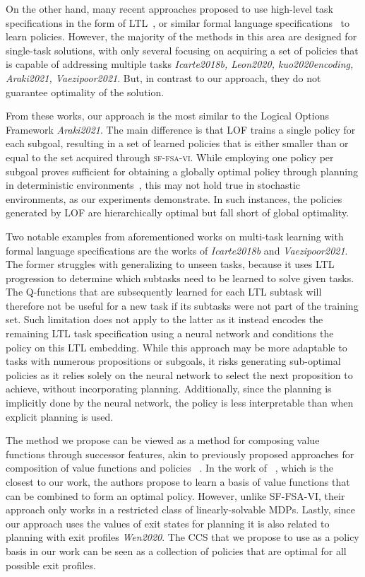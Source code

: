 On the other hand, many recent approaches proposed to use high-level task specifications in the form of LTL~\citep{Icarte2018b, Kuo2020, Vaezipoor2021, Jothimurugan2021}, or similar formal language specifications~\citep{ToroIcarte2019,Camacho2019, Araki2021, Icarte2022} to learn policies. However, the majority of the methods in this area are designed for single-task solutions, with only several focusing on acquiring a set of policies that is capable of addressing multiple tasks \textit{Icarte2018b, Leon2020, kuo2020encoding, Araki2021, Vaezipoor2021}. But, in contrast to our approach, they do not guarantee optimality of the solution.

From these works, our approach is the most similar to the Logical Options Framework \textit{Araki2021}. The main difference is that LOF trains a single policy for each subgoal, resulting in a set of learned policies that is either smaller than or equal to the set acquired through \textsc{sf-fsa-vi}. While employing one policy per subgoal proves sufficient for obtaining a globally optimal policy through planning in deterministic environments~\citep{Wen2020}, this may not hold true in stochastic environments, as our experiments demonstrate. In such instances, the policies generated by LOF are hierarchically optimal but fall short of global optimality.


Two notable examples from aforementioned works on multi-task learning with formal language specifications are the works of \textit{Icarte2018b} and \textit{Vaezipoor2021}. The former struggles with generalizing to unseen tasks, because it uses LTL progression to determine which subtasks need to be learned to solve given tasks. The Q-functions that are subsequently learned for each LTL subtask will therefore not be useful for a new task if its subtasks were not part of the training set. Such limitation does not apply to the latter as it instead encodes the remaining LTL task specification using a neural network and conditions the policy on this LTL embedding. While this approach may be more adaptable to tasks with numerous propositions or subgoals, it risks generating sub-optimal policies as it relies solely on the neural network to select the next proposition to achieve, without incorporating planning. Additionally, since the planning is implicitly done by the neural network, the policy is less interpretable than when explicit planning is used.

The method we propose can be viewed as a method for composing value functions through successor features, akin to previously proposed approaches for composition of value functions and policies ~\citep{Niekerk2019, Barreto2019, NangueTasse2020, Infante2022}. In the work of ~\citep{Infante2022}, which is the closest to our work, the authors propose to learn a basis of value functions that can be combined to form an optimal policy. However, unlike SF-FSA-VI, their approach only works in a restricted class of linearly-solvable MDPs. Lastly, since our approach uses the values of exit states for planning it is also related to planning with exit profiles \textit{Wen2020}. The CCS that we propose to use as a policy basis in our work can be seen as a collection of policies that are optimal for all possible exit profiles.

